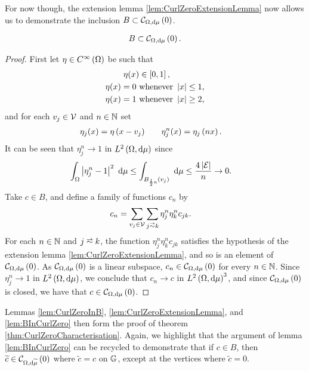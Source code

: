 For now though, the extension lemma \ref{lem:CurlZeroExtensionLemma} now allows us to demonstrate the inclusion $B\subset\mathcal{C}_{ \Omega, \mathrm{d}\mu}\left( 0 \right)$.
\begin{lemma} \label{lem:BInCurlZero}
	\begin{align*}
		B \subset \mathcal{C}_{ \Omega, \mathrm{d}\mu}\left( 0 \right).
	\end{align*}
\end{lemma}
\begin{proof}
	First let $\eta\in C^{\infty}\left( \Omega \right)$ be such that
	\begin{align*}
		\eta(x) &\in\left[ 0,1 \right], \\
		\eta(x) = 0 \ &\text{whenever } \left\lvert x \right\rvert \leq 1, \\
		\eta(x) = 1 \ &\text{whenever } \left\lvert x \right\rvert \geq 2,
	\end{align*}
	and for each $v_j\in\mathcal{V}$ and $n\in\mathbb{N}$ set
	\begin{align*}
		\eta_j(x) = \eta\left( x - v_j \right) &\qquad \eta_j^n(x) = \eta_j\left( nx \right).
	\end{align*}
	It can be seen that $\eta_j^n\rightarrow 1$ in $L^{2}\left( \Omega,\mathrm{d}\mu \right)$ since
	\begin{align*}
		\int_{\Omega} \left\lvert \eta_j^n - 1 \right\rvert^2  \ \mathrm{d}\mu 
		&\leq \int_{ B_{\frac{1}{2}{n}}(v_j)}  \ \mathrm{d}\mu \leq \frac{4\left\lvert \mathcal{E} \right\rvert}{n} \rightarrow 0.
	\end{align*}
	Take $c\in B$, and define a family of functions $c_n$ by
	\begin{align*}
		c_n &= \sum_{v_j\in\vertSet}\sum_{j\conLeft k} \eta_j^n \eta_k^n c_{jk}.
	\end{align*}
	For each $n\in\mathbb{N}$ and $j\conLeft k$, the function $\eta_j^n \eta_k^n c_{jk}$ satisfies the hypothesis of the extension lemma \ref{lem:CurlZeroExtensionLemma}, and so is an element of $\mathcal{C}_{ \Omega, \mathrm{d}\mu}\left( 0 \right)$.
	As $\mathcal{C}_{ \Omega, \mathrm{d}\mu}\left( 0 \right)$ is a linear subspace, $c_n\in\mathcal{C}_{ \Omega, \mathrm{d}\mu}\left( 0 \right)$ for every $n\in\mathbb{N}$.
	Since $\eta_j^n\rightarrow 1$ in $L^{2}\left( \Omega,\mathrm{d}\mu \right)$, we conclude that $c_n\rightarrow c$ in $L^{2}\left( \Omega,\mathrm{d}\mu \right)^3$, and since $\mathcal{C}_{ \Omega, \mathrm{d}\mu}\left( 0 \right)$ is closed, we have that $c\in\mathcal{C}_{ \Omega, \mathrm{d}\mu}\left( 0 \right)$.
\end{proof}
Lemmas \ref{lem:CurlZeroInB}, \ref{lem:CurlZeroExtensionLemma}, and \ref{lem:BInCurlZero} then form the proof of theorem \ref{thm:CurlZeroCharacterisation}.
Again, we highlight that the argument of lemma \ref{lem:BInCurlZero} can be recycled to demonstrate that if $c\in B$, then $\widetilde{c}\in\mathcal{C}_{ \Omega, \mathrm{d}\widetilde{\mu}}\left( 0 \right)$ where $\widetilde{c}=c$ on $\mathbb{G}$, except at the vertices where $\widetilde{c}=0$.

